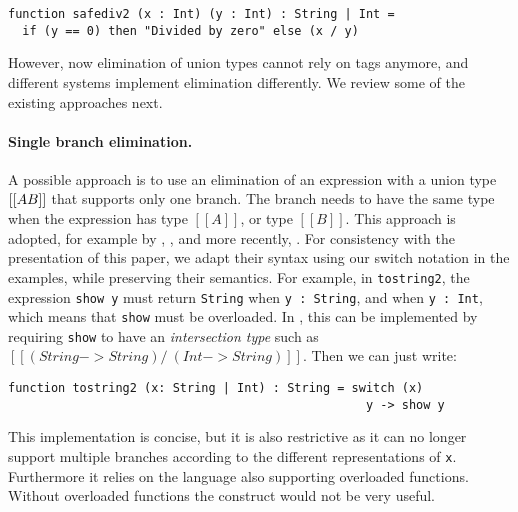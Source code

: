 \begin{lstlisting}
function safediv2 (x : Int) (y : Int) : String | Int =
  if (y == 0) then "Divided by zero" else (x / y)
\end{lstlisting}

\noindent However, now elimination of union types cannot rely on tags anymore, and
different systems implement elimination differently. We review some of the
existing approaches next.

\paragraph{Single branch elimination.}

A possible approach is to use an elimination of an expression with a union type
$[[A \/ B]]$ that supports only one branch. The branch needs to have the same
type when the expression has type $[[A]]$, or type $[[B]]$. This approach is
adopted, for example by \citet{pierce1991programming},
\citet{barbanera1995intersection}, and more recently,
\citet{dunfield2014elaborating}. For consistency with the presentation of this paper,
we adapt their syntax
using our switch notation in the examples, while preserving their semantics. For
example, in \lstinline{tostring2}, the expression \lstinline{show y} must return
\lstinline{String} when \lstinline{y : String}, and when \lstinline{y : Int},
which means that \lstinline{show} must be overloaded. In
\citet{pierce1991programming,dunfield2014elaborating,barbanera1995intersection},
this can be implemented by requiring \lstinline{show} to have an
\textit{intersection type} such as $[[(String -> String) /\ (Int -> String)]]$.
Then we can just write:

\begin{lstlisting}
function tostring2 (x: String | Int) : String = switch (x)
                                                  y -> show y
\end{lstlisting}

\noindent This implementation is concise, but it is also restrictive as it can no longer
support multiple branches according to the different representations of
\lstinline{x}. Furthermore it relies on the language also supporting overloaded
functions. Without overloaded functions the construct would not be very useful.

